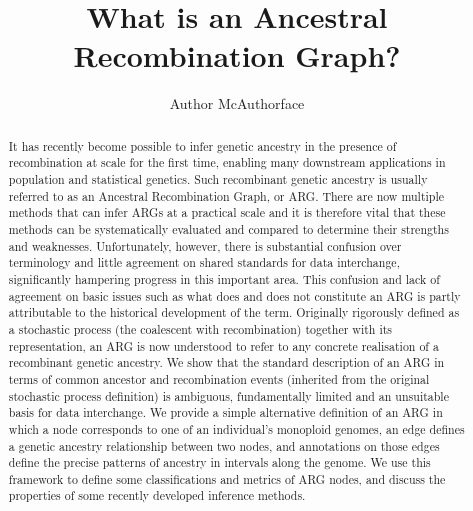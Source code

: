 \documentclass{article}
\begin{document}
\linenumbers
\title{What is an Ancestral Recombination Graph?}
\author{Author McAuthorface}

\maketitle

\begin{abstract}
It has recently become possible to infer genetic ancestry in the presence of
recombination at scale for the first time, enabling many
downstream applications in population and statistical genetics.
Such recombinant genetic ancestry is usually
referred to as an Ancestral Recombination Graph, or ARG.
There are now multiple methods that can infer ARGs at a practical scale
and it is therefore vital that these methods can be systematically evaluated
and compared to determine their strengths and weaknesses.
Unfortunately, however, there is substantial confusion over
terminology and little agreement on shared standards for data interchange,
significantly hampering progress in this important area.
This confusion and lack of agreement on basic issues such as what does and
does not constitute an ARG is partly attributable to the historical
development of the term.
Originally rigorously defined as
a stochastic process (the coalescent with recombination) together with its
representation, an ARG is now understood to refer to any
concrete realisation of a recombinant genetic ancestry.
We show that the standard description of an ARG
in terms of common ancestor and recombination events
(inherited from the original stochastic process definition) is
ambiguous, fundamentally limited and an unsuitable basis for data interchange.
We provide a simple alternative definition of an ARG in which a node
corresponds to one of an individual's monoploid genomes, an edge
defines a genetic ancestry relationship between two nodes,
and annotations on those edges define the precise patterns of
ancestry in intervals along the genome.
We use this framework to define some classifications and metrics of ARG nodes,
and discuss the properties of some recently developed inference methods.
\end{abstract}
\end{document}

